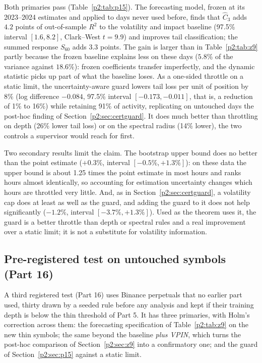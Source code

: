 Both primaries pass (Table~\ref{p2:tab:p15}). The forecasting model, frozen at its 2023--2024 estimates and applied to days never used before, finds that $\hat C_3$ adds $4.2$ points of out-of-sample $R^2$ to the volatility and impact baseline (97.5\% interval $[1.6,8.2]$, Clark--West $t=9.9$) and improves tail classification; the summed response $S_{60}$ adds $3.3$ points. The gain is larger than in Table~\ref{p2:tab:z9} partly because the frozen baseline explains less on these days ($5.8\%$ of the variance against $18.6\%$): frozen coefficients transfer imperfectly, and the dynamic statistic picks up part of what the baseline loses. As a one-sided throttle on a static limit, the uncertainty-aware guard lowers tail loss per unit of position by 8\% (log difference $-0.084$, 97.5\% interval $[-0.173,-0.011]$, that is, a reduction of 1\% to 16\%) while retaining 91\% of activity, replicating on untouched days the post-hoc finding of Section~\ref{p2:sec:certguard}. It does much better than throttling on depth (26\% lower tail loss) or on the spectral radius (14\% lower), the two controls a supervisor would reach for first.

Two secondary results limit the claim. The bootstrap upper bound does no better than the point estimate ($+0.3\%$, interval $[-0.5\%,+1.3\%]$): on these data the upper bound is about 1.25 times the point estimate in most hours and ranks hours almost identically, so accounting for estimation uncertainty changes which hours are throttled very little. And, as in Section~\ref{p2:sec:certguard}, a volatility cap does at least as well as the guard, and adding the guard to it does not help significantly ($-1.2\%$, interval $[-3.7\%,+1.3\%]$). Used as the theorem uses it, the guard is a better throttle than depth or spectral rules and a real improvement over a static limit; it is not a substitute for volatility information.

\subsection{Pre-registered test on untouched symbols (Part 16)}\label{p2:sec:p16}
A third registered test (Part 16) uses Binance perpetuals that no earlier part used, thirty drawn by a seeded rule before any analysis and kept if their training depth is below the thin threshold of Part 5. It has three primaries, with Holm's correction across them: the forecasting specification of Table~\ref{p2:tab:z9} on the new thin symbols; the same beyond the baseline \emph{plus VPIN}, which turns the post-hoc comparison of Section~\ref{p2:sec:z9} into a confirmatory one; and the guard of Section~\ref{p2:sec:p15} against a static limit.

